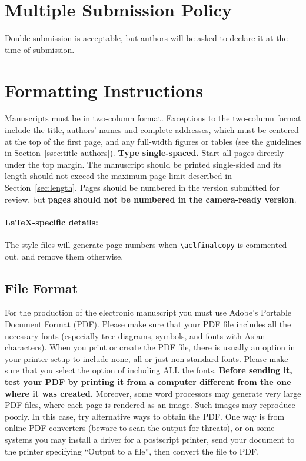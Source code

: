 \documentclass[11pt,a4paper]{article}
\begin{document}
\section{Multiple Submission Policy}

Double submission is acceptable, but authors will be asked to declare it at the time of submission. 

\section{Formatting Instructions}

Manuscripts must be in two-column format.
Exceptions to the two-column format include the title, authors' names and complete addresses, which must be centered at the top of the first page, and any full-width figures or tables (see the guidelines in Section~\ref{ssec:title-authors}).
\textbf{Type single-spaced.}
Start all pages directly under the top margin.
The manuscript should be printed single-sided and its length should not exceed the maximum page limit described in Section~\ref{sec:length}.
Pages should be numbered in the version submitted for review, but \textbf{pages should not be numbered in the camera-ready version}.

\paragraph{\LaTeX-specific details:}
The style files will generate page numbers when {\small\verb|\aclfinalcopy|} is commented out, and remove them otherwise.


\subsection{File Format}
\label{sect:pdf}

For the production of the electronic manuscript you must use Adobe's Portable Document Format (PDF).
Please make sure that your PDF file includes all the necessary fonts (especially tree diagrams, symbols, and fonts with Asian characters).
When you print or create the PDF file, there is usually an option in your printer setup to include none, all or just non-standard fonts.
Please make sure that you select the option of including ALL the fonts.
\textbf{Before sending it, test your PDF by printing it from a computer different from the one where it was created.}
Moreover, some word processors may generate very large PDF files, where each page is rendered as an image.
Such images may reproduce poorly.
In this case, try alternative ways to obtain the PDF.
One way is from online PDF converters (beware to scan the output for threats), or on some systems you may install a driver for a postscript printer, send your document to the printer specifying ``Output to a file'', then convert the file to PDF.
\end{document}
